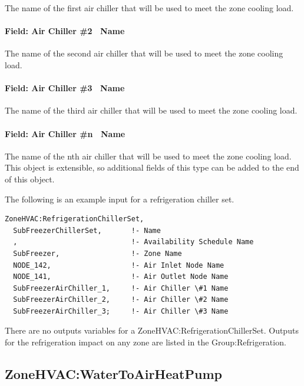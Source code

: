 The name of the first air chiller that will be used to meet the zone cooling load.

\paragraph{Field: Air Chiller \#2 ~Name}\label{field-air-chiller-2-name}

The name of the second air chiller that will be used to meet the zone cooling load.

\paragraph{Field: Air Chiller \#3 ~Name}\label{field-air-chiller-3-name}

The name of the third air chiller that will be used to meet the zone cooling load.

\paragraph{Field: Air Chiller \#n ~Name}\label{field-air-chiller-n-name}

The name of the nth air chiller that will be used to meet the zone cooling load.  This object is extensible, so additional fields of this type can be added to the end of this object.

The following is an example input for a refrigeration chiller set.

\begin{lstlisting}
ZoneHVAC:RefrigerationChillerSet,
  SubFreezerChillerSet,       !- Name
  ,                           !- Availability Schedule Name
  SubFreezer,                 !- Zone Name
  NODE_142,                   !- Air Inlet Node Name
  NODE_141,                   !- Air Outlet Node Name
  SubFreezerAirChiller_1,     !- Air Chiller \#1 Name
  SubFreezerAirChiller_2,     !- Air Chiller \#2 Name
  SubFreezerAirChiller_3;     !- Air Chiller \#3 Name
\end{lstlisting}

There are no outputs variables for a ZoneHVAC:RefrigerationChillerSet. Outputs for the refrigeration impact on any zone are listed in the Group:Refrigeration.

\subsection{ZoneHVAC:WaterToAirHeatPump}\label{zonehvacwatertoairheatpump}

